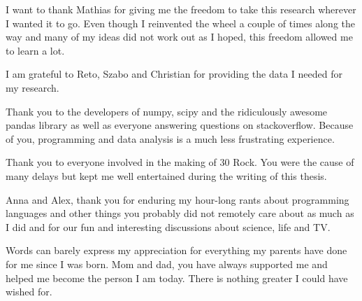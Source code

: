 I want to thank Mathias for giving me the freedom to take this research
wherever I wanted it to go. Even though I reinvented the wheel a couple of
times along the way and many of my ideas did not work out as I hoped, this
freedom allowed me to learn a lot.

I am grateful to Reto, Szabo and Christian for providing the data I needed for
my research.

Thank you to the developers of numpy, scipy and the ridiculously awesome pandas
library as well as everyone answering questions on stackoverflow. Because of
you, programming and data analysis is a much less frustrating experience.

Thank you to everyone involved in the making of 30 Rock. You were the cause of
many delays but kept me well entertained during the writing of this thesis.

Anna and Alex, thank you for enduring my hour-long rants about programming
languages and other things you probably did not remotely care about as much as
I did and for our fun and interesting discussions about science, life
and TV.

Words can barely express my appreciation for everything my parents have done
for me since I was born. Mom and dad, you have always supported me and helped
me become the person I am today. There is nothing greater I could have wished
for.

